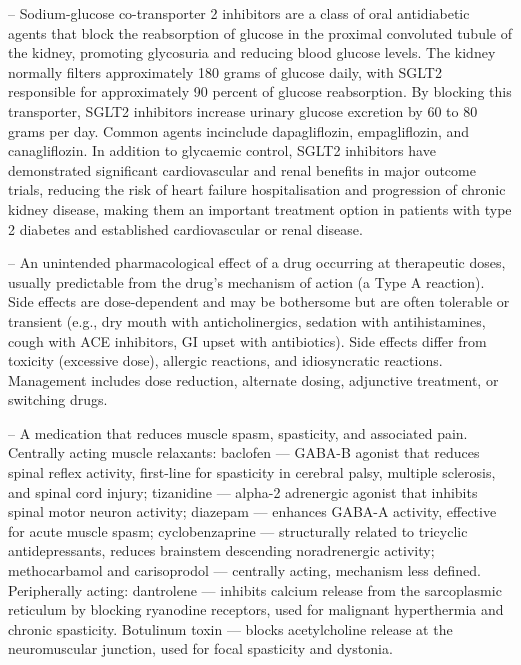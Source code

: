 -- Sodium-glucose co-transporter 2 inhibitors are a class of oral antidiabetic agents that block the reabsorption of glucose in the proximal convoluted tubule of the kidney, promoting glycosuria and reducing blood glucose levels. The kidney normally filters approximately 180 grams of glucose daily, with SGLT2 responsible for approximately 90 percent of glucose reabsorption. By blocking this transporter, SGLT2 inhibitors increase urinary glucose excretion by 60 to 80 grams per day. Common agents incinclude dapagliflozin, empagliflozin, and canagliflozin. In addition to glycaemic control, SGLT2 inhibitors have demonstrated significant cardiovascular and renal benefits in major outcome trials, reducing the risk of heart failure hospitalisation and progression of chronic kidney disease, making them an important treatment option in patients with type 2 diabetes and established cardiovascular or renal disease.

-- An unintended pharmacological effect of a drug occurring at therapeutic doses, usually predictable from the drug's mechanism of action (a Type A reaction). Side effects are dose-dependent and may be bothersome but are often tolerable or transient (e.g., dry mouth with anticholinergics, sedation with antihistamines, cough with ACE inhibitors, GI upset with antibiotics). Side effects differ from toxicity (excessive dose), allergic reactions, and idiosyncratic reactions. Management includes dose reduction, alternate dosing, adjunctive treatment, or switching drugs.

-- A medication that reduces muscle spasm, spasticity, and associated pain. Centrally acting muscle relaxants: baclofen — GABA-B agonist that reduces spinal reflex activity, first-line for spasticity in cerebral palsy, multiple sclerosis, and spinal cord injury; tizanidine — alpha-2 adrenergic agonist that inhibits spinal motor neuron activity; diazepam — enhances GABA-A activity, effective for acute muscle spasm; cyclobenzaprine — structurally related to tricyclic antidepressants, reduces brainstem descending noradrenergic activity; methocarbamol and carisoprodol — centrally acting, mechanism less defined. Peripherally acting: dantrolene — inhibits calcium release from the sarcoplasmic reticulum by blocking ryanodine receptors, used for malignant hyperthermia and chronic spasticity. Botulinum toxin — blocks acetylcholine release at the neuromuscular junction, used for focal spasticity and dystonia.

